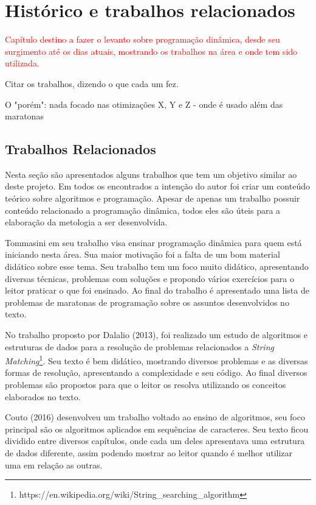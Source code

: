 
\chapter{Histórico e trabalhos relacionados}
\label{chap:historico}

\textcolor{red}{Capítulo destino a fazer o levanto sobre programação dinâmica, desde seu surgimento
até os dias atuais, mostrando os trabalhos na área e onde tem sido utilizada.}

Citar os trabalhos, dizendo o que cada um fez.

O "porém": nada focado nas otimizações X, Y e Z
- onde é usado além das maratonas


\section{Trabalhos Relacionados}
Nesta seção são apresentados alguns trabalhos que tem um objetivo similar ao deste projeto. Em todos os encontrados a intenção do autor foi criar um conteúdo teórico sobre algoritmos e programação. Apesar de apenas um trabalho possuir conteúdo relacionado a programação dinâmica, todos eles são úteis para a elaboração da metologia a ser desenvolvida.

Tommasini em seu trabalho visa ensinar programação dinâmica para quem está iniciando nesta área. Sua maior motivação foi a falta de um bom material didático sobre esse tema. Seu trabalho tem um foco muito didático, apresentando diversas técnicas, problemas com soluções e propondo vários exercícios para o leitor praticar o que foi ensinado. Ao final do trabalho é apresentado uma lista de problemas de maratonas de programação sobre os assuntos desenvolvidos no texto.


No trabalho proposto por Dalalio (2013), foi realizado um estudo de algoritmos e estruturas de dados para a resolução de problemas relacionados a \textit{String Matching}\footnote{https://en.wikipedia.org/wiki/String\_searching\_algorithm}. Seu texto é bem didático, mostrando diversos problemas e as diversas formas de resolução, apresentando a complexidade e seu código. Ao final diversos problemas são propostos para que o leitor os resolva utilizando os conceitos elaborados no texto.


Couto (2016) desenvolveu um trabalho voltado ao ensino de algoritmos, seu foco principal são os algoritmos aplicados em sequências de caracteres. Seu texto ficou dividido entre diversos capítulos, onde cada um deles apresentava uma estrutura de dados diferente, assim podendo mostrar ao leitor quando é melhor utilizar uma em relação as outras.






